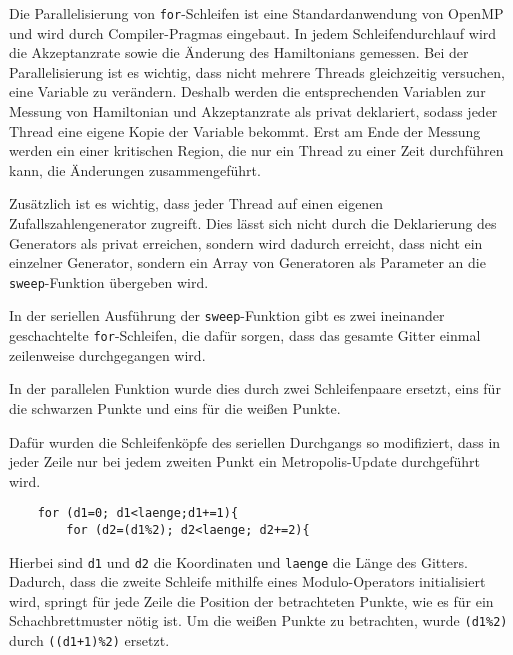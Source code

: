 	Die Parallelisierung von \texttt{for}-Schleifen ist eine Standardanwendung von OpenMP und wird durch Compiler-Pragmas eingebaut. In jedem Schleifendurchlauf wird die Akzeptanzrate sowie die Änderung des Hamiltonians gemessen. Bei der Parallelisierung ist es wichtig, dass nicht mehrere Threads gleichzeitig versuchen, eine Variable zu verändern. Deshalb werden die entsprechenden Variablen zur Messung von Hamiltonian und Akzeptanzrate als privat deklariert, sodass jeder Thread eine eigene Kopie der Variable bekommt. Erst am Ende der Messung werden ein einer kritischen Region, die nur ein Thread zu einer Zeit durchführen kann, die Änderungen zusammengeführt. 	%
	
	
	Zusätzlich ist es wichtig, dass jeder Thread auf einen eigenen Zufallszahlengenerator zugreift. Dies lässt sich nicht durch die Deklarierung des Generators als privat erreichen, sondern wird dadurch erreicht, dass nicht ein einzelner Generator, sondern ein Array von Generatoren als Parameter an die \texttt{sweep}-Funktion übergeben wird.
	
	In der seriellen Ausführung der \texttt{sweep}-Funktion gibt es zwei ineinander geschachtelte \texttt{for}-Schleifen, die dafür sorgen, dass das gesamte Gitter einmal zeilenweise durchgegangen wird.
	
	In der parallelen Funktion wurde dies durch zwei Schleifenpaare ersetzt, eins für die schwarzen Punkte und eins für die weißen Punkte.
	
	Dafür wurden die Schleifenköpfe des seriellen Durchgangs so modifiziert, dass in jeder Zeile nur bei jedem zweiten Punkt ein Metropolis-Update durchgeführt wird. 
	\begin{verbatim}
	for (d1=0; d1<laenge;d1+=1){
		for (d2=(d1%2); d2<laenge; d2+=2){
	\end{verbatim}
	Hierbei sind \texttt{d1} und \texttt{d2} die Koordinaten und \texttt{laenge} die Länge des Gitters. Dadurch, dass die zweite Schleife mithilfe eines Modulo-Operators initialisiert wird, springt für jede Zeile die Position der betrachteten Punkte, wie es für ein Schachbrettmuster nötig ist. Um die weißen Punkte zu betrachten, wurde \texttt{(d1\%2)} durch \texttt{((d1+1)\%2)} ersetzt.
	
